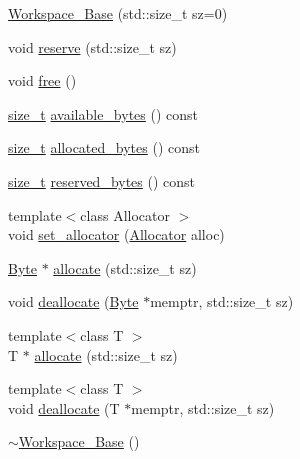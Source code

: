 \begin{DoxyCompactItemize}
\item 
\hyperlink{classBC_1_1allocators_1_1fancy_1_1detail_1_1Workspace__Base_af2a2e699b28e6a35357fa2fd9c45907d}{Workspace\+\_\+\+Base} (std\+::size\+\_\+t sz=0)
\item 
void \hyperlink{classBC_1_1allocators_1_1fancy_1_1detail_1_1Workspace__Base_aeec306070f99af349925a82e02f55ee3}{reserve} (std\+::size\+\_\+t sz)
\item 
void \hyperlink{classBC_1_1allocators_1_1fancy_1_1detail_1_1Workspace__Base_a6407b068245c3a6e267812d64497da27}{free} ()
\item 
\hyperlink{namespaceBC_a6007cbc4eeec401a037b558910a56173}{size\+\_\+t} \hyperlink{classBC_1_1allocators_1_1fancy_1_1detail_1_1Workspace__Base_aade3d971b824f7bf34383f75736a0014}{available\+\_\+bytes} () const 
\item 
\hyperlink{namespaceBC_a6007cbc4eeec401a037b558910a56173}{size\+\_\+t} \hyperlink{classBC_1_1allocators_1_1fancy_1_1detail_1_1Workspace__Base_a7a88cbeca1b9af7f11d2ad432d1f649a}{allocated\+\_\+bytes} () const 
\item 
\hyperlink{namespaceBC_a6007cbc4eeec401a037b558910a56173}{size\+\_\+t} \hyperlink{classBC_1_1allocators_1_1fancy_1_1detail_1_1Workspace__Base_a122379191b8051b2963c1fcf7fcd6994}{reserved\+\_\+bytes} () const 
\item 
{\footnotesize template$<$class Allocator $>$ }\\void \hyperlink{classBC_1_1allocators_1_1fancy_1_1detail_1_1Workspace__Base_a90c3bdabe883a74e2566c0a064106528}{set\+\_\+allocator} (\hyperlink{namespaceBC_a934f94b17b06290e6b241e5f59930c5f}{Allocator} alloc)
\item 
\hyperlink{classBC_1_1allocators_1_1Byte}{Byte} $\ast$ \hyperlink{classBC_1_1allocators_1_1fancy_1_1detail_1_1Workspace__Base_aa977120c1b30215844003e09a3d9893a}{allocate} (std\+::size\+\_\+t sz)
\item 
void \hyperlink{classBC_1_1allocators_1_1fancy_1_1detail_1_1Workspace__Base_a8e996a1542d3f30a264d9238ec2f8321}{deallocate} (\hyperlink{classBC_1_1allocators_1_1Byte}{Byte} $\ast$memptr, std\+::size\+\_\+t sz)
\item 
{\footnotesize template$<$class T $>$ }\\T $\ast$ \hyperlink{classBC_1_1allocators_1_1fancy_1_1detail_1_1Workspace__Base_a278a504cb85bf588d2bb35f3a03da120}{allocate} (std\+::size\+\_\+t sz)
\item 
{\footnotesize template$<$class T $>$ }\\void \hyperlink{classBC_1_1allocators_1_1fancy_1_1detail_1_1Workspace__Base_a67ed4027b82514170a0ee770691d91fd}{deallocate} (T $\ast$memptr, std\+::size\+\_\+t sz)
\item 
\hyperlink{classBC_1_1allocators_1_1fancy_1_1detail_1_1Workspace__Base_a68f95b8cfc546e9780428d5367b16e60}{$\sim$\+Workspace\+\_\+\+Base} ()
\end{DoxyCompactItemize}


